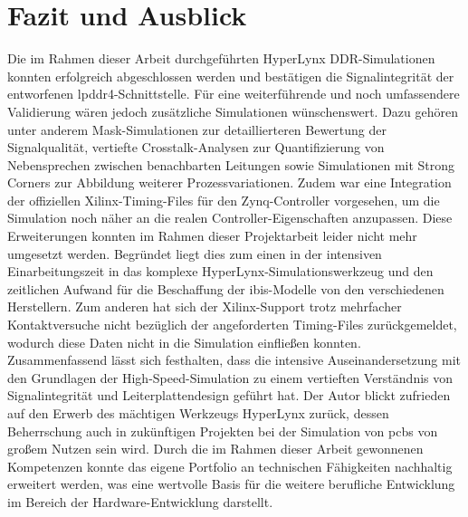 \chapter{Fazit und Ausblick}
Die im Rahmen dieser Arbeit durchgeführten HyperLynx DDR-Simulationen konnten erfolgreich abgeschlossen werden und bestätigen die Signalintegrität der entworfenen \gls{lpddr4}-Schnittstelle. Für eine weiterführende und noch umfassendere Validierung wären jedoch zusätzliche Simulationen wünschenswert. Dazu gehören unter anderem Mask-Simulationen zur detaillierteren Bewertung der Signalqualität, vertiefte Crosstalk-Analysen zur Quantifizierung von Nebensprechen zwischen benachbarten Leitungen sowie Simulationen mit Strong Corners zur Abbildung weiterer Prozessvariationen. Zudem war eine Integration der offiziellen Xilinx-Timing-Files für den Zynq-Controller vorgesehen, um die Simulation noch näher an die realen Controller-Eigenschaften anzupassen. Diese Erweiterungen konnten im Rahmen dieser Projektarbeit leider nicht mehr umgesetzt werden. Begründet liegt dies zum einen in der intensiven Einarbeitungszeit in das komplexe HyperLynx-Simulationswerkzeug und den zeitlichen Aufwand für die Beschaffung der \gls{ibis}-Modelle von den verschiedenen Herstellern. Zum anderen hat sich der Xilinx-Support trotz mehrfacher Kontaktversuche nicht bezüglich der angeforderten Timing-Files zurückgemeldet, wodurch diese Daten nicht in die Simulation einfließen konnten.
Zusammenfassend lässt sich festhalten, dass die intensive Auseinandersetzung mit den Grundlagen der High-Speed-Simulation zu einem vertieften Verständnis von Signalintegrität und Leiterplattendesign geführt hat. Der Autor blickt zufrieden auf den Erwerb des mächtigen Werkzeugs HyperLynx zurück, dessen Beherrschung auch in zukünftigen Projekten bei der Simulation von \gls{pcb}s von großem Nutzen sein wird. Durch die im Rahmen dieser Arbeit gewonnenen Kompetenzen konnte das eigene Portfolio an technischen Fähigkeiten nachhaltig erweitert werden, was eine wertvolle Basis für die weitere berufliche Entwicklung im Bereich der Hardware-Entwicklung darstellt.